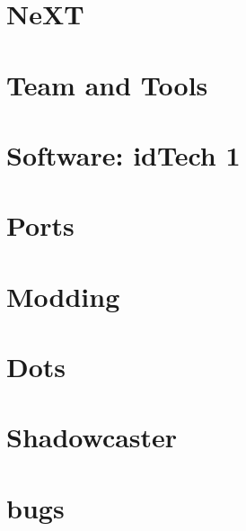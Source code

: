 \documentclass{book}
\begin{document}
        


        
     \chapter{NeXT}
          


    

    \chapter{Team and Tools}
       
       
       
      
      
      
      
      




     \chapter{Software: idTech 1}
      
      
      
      
      
      
      
      
      
      
      
      
      
      
      

    \chapter{Ports}        
          

    \chapter{Modding}
      

    \appendix
    \appendixpage
    \chapter{Dots}  
      
      \chapter{Shadowcaster}  
      
      \chapter{bugs}
      
\end{document}
